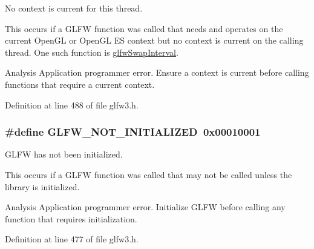 No context is current for this thread. 

This occurs if a G\+L\+F\+W function was called that needs and operates on the current Open\+G\+L or Open\+G\+L E\+S context but no context is current on the calling thread. One such function is \hyperlink{group__context_ga12a595c06947cec4967c6e1f14210a8a}{glfw\+Swap\+Interval}.

\begin{DoxyParagraph}{Analysis}
Application programmer error. Ensure a context is current before calling functions that require a current context. 
\end{DoxyParagraph}


Definition at line 488 of file glfw3.\+h.

\hypertarget{group__errors_ga2374ee02c177f12e1fa76ff3ed15e14a}{}
\subsubsection[{G\+L\+F\+W\+\_\+\+N\+O\+T\+\_\+\+I\+N\+I\+T\+I\+A\+L\+I\+Z\+E\+D}]{\setlength{\rightskip}{0pt plus 5cm}\#define G\+L\+F\+W\+\_\+\+N\+O\+T\+\_\+\+I\+N\+I\+T\+I\+A\+L\+I\+Z\+E\+D~0x00010001}\label{group__errors_ga2374ee02c177f12e1fa76ff3ed15e14a}


G\+L\+F\+W has not been initialized. 

This occurs if a G\+L\+F\+W function was called that may not be called unless the library is initialized.

\begin{DoxyParagraph}{Analysis}
Application programmer error. Initialize G\+L\+F\+W before calling any function that requires initialization. 
\end{DoxyParagraph}


Definition at line 477 of file glfw3.\+h.

\hypertarget{group__errors_ga9023953a2bcb98c2906afd071d21ee7f}{}
